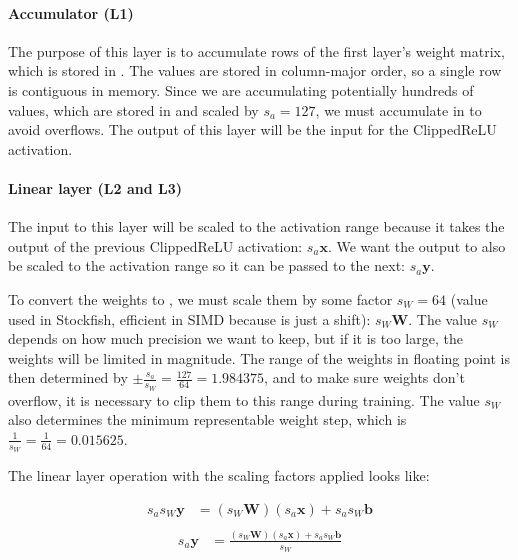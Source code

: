 
\paragraph[short]{Accumulator (L1)}



The purpose of this layer is to accumulate rows of the first layer's weight matrix, which is stored in . The values are stored in column-major order, so a single row is contiguous in memory. Since we are accumulating potentially hundreds of values, which are stored in  and scaled by $s_a=127$, we must accumulate in  to avoid overflows. The output of this layer will be the input for the ClippedReLU activation.

\paragraph[short]{Linear layer (L2 and L3)} The input to this layer will be scaled to the activation range because it takes the output of the previous ClippedReLU activation: $s_a \bm{x}$. We want the output to also be scaled to the activation range so it can be passed to the next: $s_a \bm{y}$.

To convert the weights to , we must scale them by some factor $s_W=64$ (value used in Stockfish, efficient in SIMD because is just a shift): $s_W \bm{W}$. The value $s_W$ depends on how much precision we want to keep, but if it is too large, the weights will be limited in magnitude. The range of the weights in floating point is then determined by \mbox{$\pm \frac{s_a}{s_W}=\frac{127}{64}=1.984375$}, and to make sure weights don't overflow, it is necessary to clip them to this range during training. The value $s_W$ also determines the minimum representable weight step, which is $\frac{1}{s_W}=\frac{1}{64}=0.015625$.

The linear layer operation with the scaling factors applied looks like:

\begin{equation}
\begin{aligned}
s_a s_W \bm{y} &= (s_W \bm{W}) (s_a \bm{x}) + s_a s_W \bm{b} \\
\end{aligned}
\end{equation}
\begin{equation}
\begin{aligned}
s_a \bm{y} &= \frac{(s_W \bm{W}) (s_a \bm{x}) + s_a s_W \bm{b}}{s_W} \\
\end{aligned}
\end{equation}


